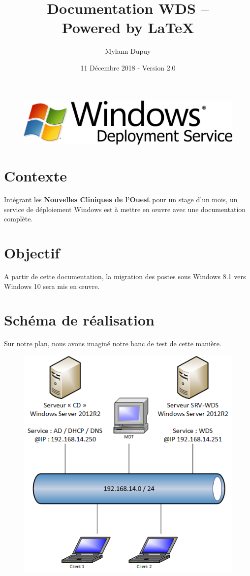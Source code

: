 \documentclass[11pt,a4paper,oneside]{article}
\author{Mylann Dupuy}
\title{Documentation WDS --  \\ Powered by \LaTeX}
\date{11 Décembre 2018 - Version 2.0}
\begin{document}
\maketitle
\begin{figure}[hbtp]
\centering
\includegraphics[scale=1]{Pictures/bannierewds.png}
\end{figure}
\newpage

\tableofcontents
\newpage
\setcounter{page}{3}
\newpage

\section{Contexte}
Intégrant les \textbf{Nouvelles Cliniques de l'Ouest} pour un stage d'un mois, un service de déploiement Windows est à mettre en \oe{}uvre avec une documentation complète.

\section{Objectif}
A partir de cette documentation, la migration des postes sous Windows 8.1 vers Windows 10 sera mis en \oe{}uvre.

\section{Schéma de réalisation}
Sur notre plan, nous avons imaginé notre banc de test de cette manière. \\ 
\begin{figure}[hbtp]
\centering
\includegraphics[scale=1.2]{Pictures/Plan.png}
\end{figure}
\newpage
\end{document}
